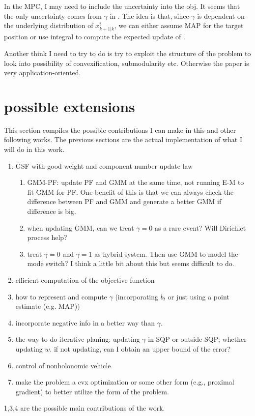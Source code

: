 \documentclass[letterpaper, 10 pt, conference]{ieeeconf}  %
\begin{document}
In the MPC, I may need to include the uncertainty into the obj. It seems that the only uncertainty comes from $\gamma$ in .
The idea is that, since $\gamma$ is dependent on the underlying distribution of $x^i_{k+1|k}$, we can either assume MAP for the target position or use integral to compute the expected update of .

Another think I need to try to do is try to exploit the structure of the problem to look into possibility of convexification, submodularity etc. Otherwise the paper is very application-oriented.

\section{possible extensions}
This section compiles the possible contributions I can make in this and other following works. The previous sections are the actual implementation of what I will do in this work.
\begin{enumerate}
	\item GSF with good weight and component number update law
		\begin{enumerate}
			\item GMM-PF: update PF and GMM at the same time, not running E-M to fit GMM for PF. One benefit of this is that we can always check the difference between PF and GMM and generate a better GMM if difference is big.
			\item when updating GMM, can we treat $\gamma=0$ as a rare event? Will Dirichlet process help?
			\item treat $\gamma=0$ and $\gamma=1$ as hybrid system. Then use GMM to model the mode switch? I think a little bit about this but seems difficult to do.
		\end{enumerate}
	\item efficient computation of the objective function
	\item how to represent and compute $\gamma$ (incorporating $b_t$ or just using a point estimate (e.g. MAP))
	\item incorporate negative info in a better way than $\gamma$.
	\item the way to do iterative planing: updating $\gamma$ in SQP or outside SQP; whether updating $w$. if not updating, can I obtain an upper bound of the error?
	\item control of nonholonomic vehicle
	\item make the problem a cvx optimization or some other form (e.g., proximal gradient) to better utilize the form of the problem.
\end{enumerate}
1,3,4 are the possible main contributions of the work.
\end{document}
